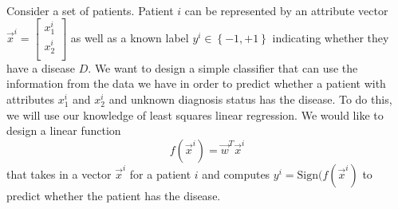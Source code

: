 
 \\
Consider a set of patients. Patient $i$ can be represented by an attribute vector $\vec{x}^i = \begin{bmatrix}
x_1^i\\ 
x_2^i\\ 
\end{bmatrix}$ as well as a known label $y^i \in \left \{ -1, +1 \right \}$ indicating whether they have a disease $D$. We want to design a simple classifier that can use the information from the data we have in order to predict whether a patient with attributes $x_1^i$ and $x_2^i$ and unknown diagnosis status has the disease. To do this, we will use our knowledge of least squares linear regression. We would like to design a linear function
$$f(\vec{x}^i) = \vec{w}^T \vec{x}^i$$
that takes in a vector $\vec{x}^i$ for a patient $i$ and computes $y^i = \text{Sign}(f(\vec{x}^i)$ to predict whether the patient has the disease.

